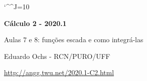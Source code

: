 \documentclass[oneside,12pt]{article}
\begin{document}
\catcode`\^^J=10

\pu


\long{}
\long{}
\long{}
\long{}
\long{}
\long{}
\long{}
\long{}
\long{}
\long{}

\long{}
\long{}

\def\frown{\ensuremath{{=}{(}}}
\def\True {\mathbf{V}}
\def\False{\mathbf{F}}

\def\drafturl{http://angg.twu.net/LATEX/2020-1-C2.pdf}
\def\drafturl{http://angg.twu.net/2020.1-C2.html}
\def\draftfooter{\tiny \href{\drafturl}{\jobname{}} \ColorBrown{\shorttoday{} \hours}}



%

\thispagestyle{empty}

\begin{center}

\vspace*{1.2cm}

{\bf \Large Cálculo 2 - 2020.1}

\bsk

Aulas 7 e 8: funções escada e como integrá-las

\bsk

Eduardo Ochs - RCN/PURO/UFF

\url{http://angg.twu.net/2020.1-C2.html}

\end{center}
\end{document}
